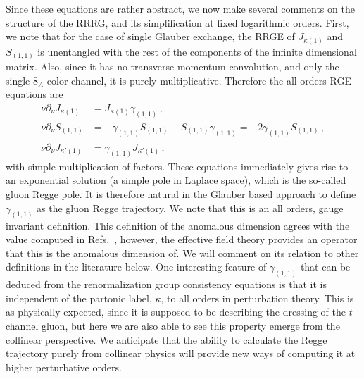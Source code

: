 \documentclass[letterpaper,11pt]{article}
\newcommand{\nn}{\nonumber}
\begin{document}
Since these equations are rather abstract, we now make several comments on the structure of the RRRG, and its simplification at fixed logarithmic orders. First, we note that for the case of single Glauber exchange, the RRGE of $J_{\kappa(1)}$ and $S_{(1,1)}$ is unentangled with the rest of the components of the infinite dimensional matrix. Also, since it has no transverse momentum convolution, and only the single $8_A$ color channel, it is purely multiplicative. Therefore the all-orders RGE equations are
\begin{align}
  \nu\partial_\nu J_{\kappa(1)}&=J_{\kappa(1)} \gamma_{(1,1)}\,,
  \\
  \nu\partial_\nu S_{(1,1)}&=-\gamma_{(1,1)} S_{(1,1)} - S_{(1,1)}  \gamma_{(1,1)}=-2\gamma_{(1,1)} S_{(1,1)} \,,
 \nn \\
  \nu\partial_\nu \bar J_{\kappa'(1)}&=\gamma_{(1,1)} \bar J_{\kappa'(1)}
 \nn \,,
\end{align}
with simple multiplication of factors.
These equations immediately gives rise to an exponential solution (a simple pole in Laplace space), which is the so-called gluon Regge pole. It is therefore natural in the Glauber based approach to define $\gamma_{(1,1)}$ as the gluon Regge trajectory. We note that this is an all orders, gauge invariant definition. This definition of the anomalous dimension agrees with the value computed in Refs.~\cite{Falcioni:2020lvv,Falcioni:2021buo,Falcioni:2021dgr,Caola:2021izf}, however, the effective field theory provides an operator that this is the anomalous dimension of. We will comment on its relation to other definitions in the literature below. One interesting feature of $\gamma_{(1,1)}$ that can be deduced from the renormalization group consistency equations is that it is independent of the partonic label, $\kappa$, to all orders in perturbation theory. This is as physically expected, since it is supposed to be describing the dressing of the $t$-channel gluon, but here we are also able to see this property emerge from the collinear perspective.  We anticipate that the ability to calculate the Regge trajectory purely from collinear physics will provide new ways of computing it at higher perturbative orders.
\end{document}
